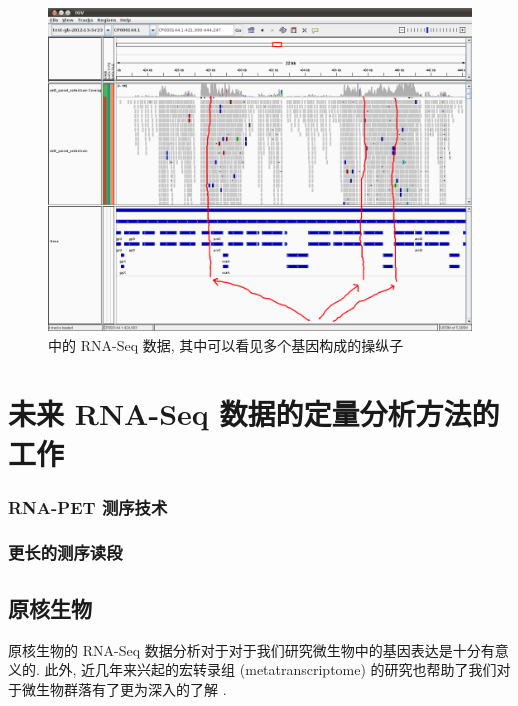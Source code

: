 \begin{figure}[!t]
\centering
\includegraphics[width=\textwidth]{figures/disc/disc-bacteria-operons-1.png}
\caption{ 中的 RNA-Seq 数据, 
其中可以看见多个基因构成的操纵子}
\label{disc-bacteria-operons-1}
\end{figure}

\section{未来 RNA-Seq 数据的定量分析方法的工作}

\subsubsection{RNA-PET 测序技术} %

\subsubsection{更长的测序读段} %

\subsection{原核生物}
原核生物的 RNA-Seq 数据分析对于对于我们研究微生物中的基因表达是十分有意义的. 
此外, 近几年来兴起的宏转录组 (metatranscriptome) 的研究也帮助了我们对于微生物群落有了更为深入的了解
\cite{gilbert2008detection, urich2008simultaneous, gifford2010quantitative, 
helbling2011activity, mason2012metagenome, huson2011integrative, 
lesniewski2012metatranscriptome}. 

